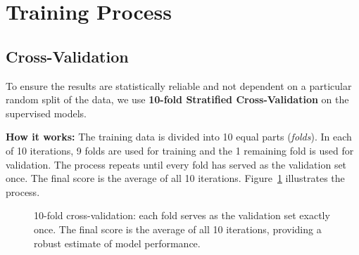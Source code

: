 \documentclass[12pt,a4paper]{report}
\begin{document}
\section{Training Process}

\subsection{Cross-Validation}

To ensure the results are statistically reliable and not dependent on a particular random split of the data, we use \textbf{10-fold Stratified Cross-Validation} on the supervised models.

\textbf{How it works:} The training data is divided into 10 equal parts (\textit{folds}). In each of 10 iterations, 9 folds are used for training and the 1 remaining fold is used for validation. The process repeats until every fold has served as the validation set once. The final score is the average of all 10 iterations. Figure~\ref{fig:cv} illustrates the process.

\begin{figure}[H]
\centering
{}
\caption{10-fold cross-validation: each fold serves as the validation set exactly once. The final score is the average of all 10 iterations, providing a robust estimate of model performance.}
\label{fig:cv}
\end{figure}
\end{document}
